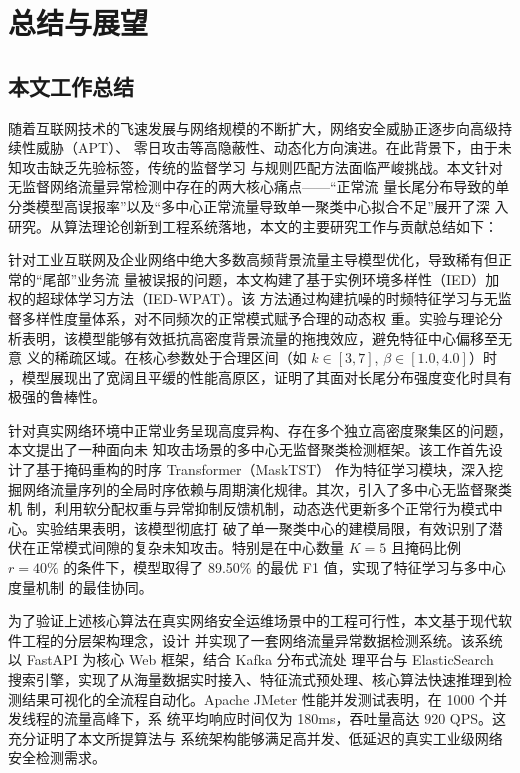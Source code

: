 \chapter{总结与展望}
\section{本文工作总结}
随着互联网技术的飞速发展与网络规模的不断扩大，网络安全威胁正逐步向高级持续性威胁（APT）、
零日攻击等高隐蔽性、动态化方向演进。在此背景下，由于未知攻击缺乏先验标签，传统的监督学习
与规则匹配方法面临严峻挑战。本文针对无监督网络流量异常检测中存在的两大核心痛点——“正常流
量长尾分布导致的单分类模型高误报率”以及“多中心正常流量导致单一聚类中心拟合不足”展开了深
入研究。从算法理论创新到工程系统落地，本文的主要研究工作与贡献总结如下：

针对工业互联网及企业网络中绝大多数高频背景流量主导模型优化，导致稀有但正常的“尾部”业务流
量被误报的问题，本文构建了基于实例环境多样性（IED）加权的超球体学习方法（IED-WPAT）。该
方法通过构建抗噪的时频特征学习与无监督多样性度量体系，对不同频次的正常模式赋予合理的动态权
重。实验与理论分析表明，该模型能够有效抵抗高密度背景流量的拖拽效应，避免特征中心偏移至无意
义的稀疏区域。在核心参数处于合理区间（如 $k \in [3,7]$, $\beta \in [1.0, 4.0]$）时
，模型展现出了宽阔且平缓的性能高原区，证明了其面对长尾分布强度变化时具有极强的鲁棒性。

针对真实网络环境中正常业务呈现高度异构、存在多个独立高密度聚集区的问题，本文提出了一种面向未
知攻击场景的多中心无监督聚类检测框架。该工作首先设计了基于掩码重构的时序 Transformer（MaskTST）
作为特征学习模块，深入挖掘网络流量序列的全局时序依赖与周期演化规律。其次，引入了多中心无监督聚类机
制，利用软分配权重与异常抑制反馈机制，动态迭代更新多个正常行为模式中心。实验结果表明，该模型彻底打
破了单一聚类中心的建模局限，有效识别了潜伏在正常模式间隙的复杂未知攻击。特别是在中心数量 $K=5$ 
且掩码比例 $r=40\%$ 的条件下，模型取得了 89.50\% 的最优 F1 值，实现了特征学习与多中心度量机制
的最佳协同。

为了验证上述核心算法在真实网络安全运维场景中的工程可行性，本文基于现代软件工程的分层架构理念，设计
并实现了一套网络流量异常数据检测系统。该系统以 FastAPI 为核心 Web 框架，结合 Kafka 分布式流处
理平台与 ElasticSearch 搜索引擎，实现了从海量数据实时接入、特征流式预处理、核心算法快速推理到检
测结果可视化的全流程自动化。Apache JMeter 性能并发测试表明，在 1000 个并发线程的流量高峰下，系
统平均响应时间仅为 180ms，吞吐量高达 920 QPS。这充分证明了本文所提算法与
系统架构能够满足高并发、低延迟的真实工业级网络安全检测需求。


